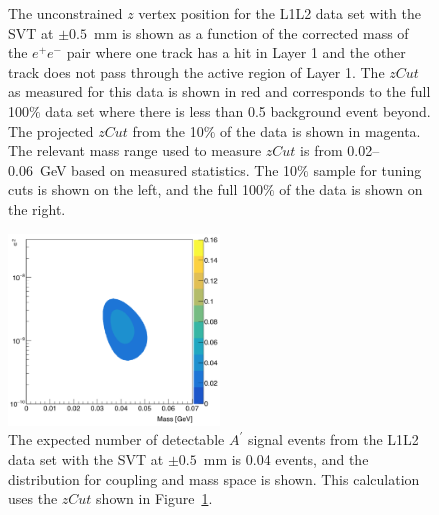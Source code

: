 \begin{figure}[hbt]
  \caption[$z$ vertex and mass distribution for the L1L2 data set with the SVT at $\pm0.5$~mm]{The unconstrained $z$ vertex position for the L1L2 data set with the SVT at $\pm0.5$~mm is shown as a function of the corrected mass of the $e^+e^-$ pair where one track has a hit in Layer 1 and the other track does not pass through the active region of Layer 1. The $zCut$ as measured for this data is shown in red and corresponds to the full 100$\%$ data set where there is less than 0.5 background event beyond. The projected $zCut$ from the 10$\%$ of the data is shown in magenta. The relevant mass range used to measure $zCut$ is from 0.02--0.06~GeV based on measured statistics. The 10$\%$ sample for tuning cuts is shown on the left, and the full 100$\%$ of the data is shown on the right.}
  \label{fig:zvm_l1l2}
\end{figure}
\begin{figure}[htb]
  \centering
      \includegraphics[width=0.5\textwidth]{pics/appendix/reachL1L2_0p5.png}
  \caption[Expected detectable $A^{\prime}$ signal yield from the L1L2 data at 0.5~mm.]{The expected number of detectable $A^{\prime}$ signal events from the L1L2 data set with the SVT at $\pm0.5$~mm is 0.04 events, and the distribution for coupling and mass space is shown. This calculation uses the $zCut$ shown in Figure~\ref{fig:zvm_l1l2}.}
  \label{fig:rl1l20p5}
\end{figure} 
